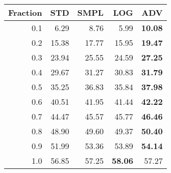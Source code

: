 \documentclass{standalone}
\begin{document}
\begin{tabular}{r|rrrr}
      \toprule
      Fraction & STD & SMPL & LOG & ADV\\
      \midrule
      0.1 & 6.29 & 8.76 & 5.99 & \textbf{10.08}\\
  0.2 & 15.38 & 17.77 & 15.95 & \textbf{19.47}\\
  0.3 & 23.94 & 25.55 & 24.59 & \textbf{27.25}\\
  0.4 & 29.67 & 31.27 & 30.83 & \textbf{31.79}\\
  0.5 & 35.25 & 36.83 & 35.84 & \textbf{37.98}\\
  0.6 & 40.51 & 41.95 & 41.44 & \textbf{42.22}\\
  0.7 & 44.47 & 45.57 & 45.77 & \textbf{46.46}\\
  0.8 & 48.90 & 49.60 & 49.37 & \textbf{50.40}\\
  0.9 & 51.99 & 53.36 & 53.89 & \textbf{54.14}\\
  1.0 & 56.85 & 57.25 & \textbf{58.06} & 57.27\\
  \bottomrule
\end{tabular}
\end{document}
